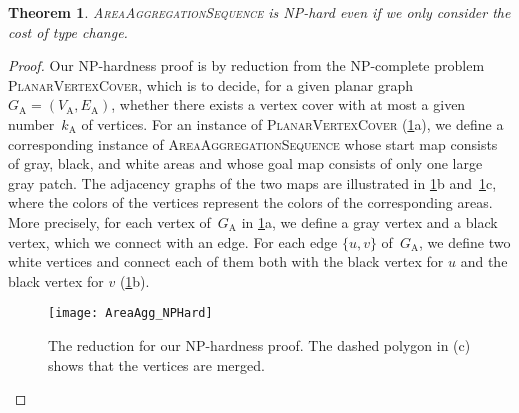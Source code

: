 \newtheorem{thm}{Theorem}
\begin{thm}
\textsc{AreaAggregationSequence} is NP-hard 
even if we only consider the cost of type change.
\end{thm}

\begin{proof}
Our NP-hardness proof is by reduction from 
the NP-complete problem \textsc{PlanarVertexCover}, 
which is to decide, for a given 
planar graph~$G_\mathrm{A} = (V_\mathrm{A},E_\mathrm{A})$, 
whether there exists a vertex cover 
with at most a given number~$k_\mathrm{A}$ of vertices. 
For an instance of \textsc{PlanarVertexCover}
(\fig\ref{fig:AreaAgg_Reduction}a), 
we define a corresponding instance of \textsc{AreaAggregationSequence}
whose start map consists of gray, black, and white areas and 
whose goal map consists of only one large gray patch.
The adjacency graphs of the two maps are illustrated 
in \figs\ref{fig:AreaAgg_Reduction}b and~\ref{fig:AreaAgg_Reduction}c, 
where the colors of the vertices represent 
the colors of the corresponding areas.
More precisely, for each vertex of~$G_\mathrm{A}$
in \fig\ref{fig:AreaAgg_Reduction}a, 
we define a gray vertex and a black vertex, 
which we connect with an edge. 
For each edge $\{u,v\}$ of~$G_\mathrm{A}$, 
we define two white vertices and 
connect each of them both with the black vertex for $u$
and the black vertex for $v$
(\fig\ref{fig:AreaAgg_Reduction}b).

\begin{figure}[tb]
\centering
\texttt{[image: AreaAgg\_NPHard]}
\caption{The reduction for our NP-hardness proof.
    The dashed polygon in (c) shows 
    that the vertices are merged.}
\label{fig:AreaAgg_Reduction}
\end{figure}


\end{proof}
